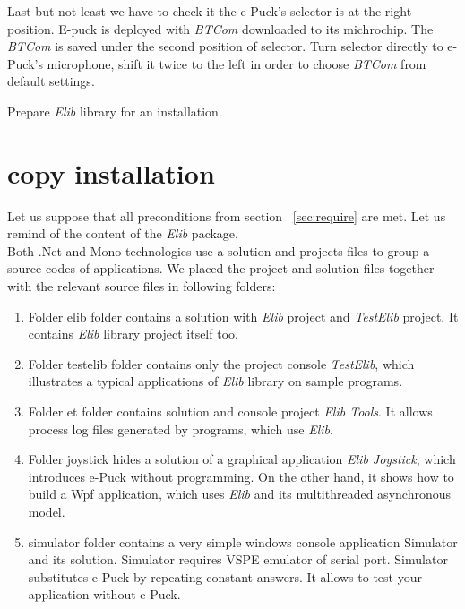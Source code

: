   Last but not least we have to check it the e-Puck's selector is at the right position.
  E-puck is deployed with {\it BTCom} downloaded to its michrochip. 
  The {\it BTCom} is saved under the second position of selector. 
  Turn selector directly to e-Puck's microphone, shift it twice to the left 
  in order to choose {\it BTCom} from default settings.

  Prepare {\it Elib} library for an installation.
  
  \section{copy installation} \label{sec:copy}
  Let us suppose that all preconditions from section ~\ref{sec:require} are met.
  Let us remind of the content of the {\it Elib} package.\\

  Both .Net and Mono technologies use a solution and projects files to group a source codes of applications.
  We placed the project and solution files together with the relevant source files in following folders:

  \begin{enumerate}
          \item Folder { \sf elib} folder contains a solution with {\it Elib} project and {\it TestElib} project.
                  It contains {\it Elib} library project itself too.
          \item Folder { \sf testelib} folder contains only the project console {\it TestElib}, 
          which illustrates a typical applications of {\it Elib} library on sample programs.
          \item Folder { \sf et} folder contains solution and console project {\it Elib Tools}. 
          It allows process log files generated by programs,
          which use {\it Elib}.
          \item Folder { \sf joystick} hides a solution of a graphical application {\it Elib Joystick},
          which introduces e-Puck without programming. On the other hand, it shows
          how to build a Wpf application, which uses {\it Elib} and its multithreaded asynchronous model.
          \item { \sf simulator} folder contains a very simple windows console application Simulator and its solution. 
          Simulator requires VSPE emulator of serial port. Simulator
           substitutes e-Puck by repeating constant answers. It allows to test your application without e-Puck.
  \end{enumerate}

